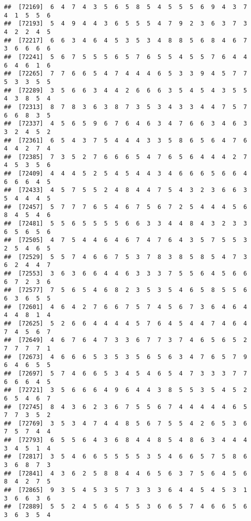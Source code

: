 \documentclass[
]{book}
\begin{document}
\begin{verbatim}
##  [72169]  6  4  7  4  3  5  6  5  8  5  4  5  5  5  6  9  4  3  7  4  1  5  5  6
##  [72193]  5  4  9  4  4  3  6  5  5  5  4  7  9  2  3  6  3  7  3  4  2  2  4  5
##  [72217]  6  6  3  4  6  4  5  3  5  3  4  8  8  5  6  8  4  6  7  3  6  6  6  6
##  [72241]  5  6  7  5  5  5  6  5  7  6  5  5  4  5  5  7  6  4  4  6  4  6  1  6
##  [72265]  7  7  6  6  5  4  7  4  4  4  6  5  3  3  9  4  5  7  7  5  3  3  5  5
##  [72289]  3  5  6  6  3  4  4  2  6  6  6  3  5  4  5  4  3  5  5  4  3  8  5  4
##  [72313]  8  7  8  3  6  3  8  7  3  5  3  4  3  3  4  4  7  5  7  6  6  8  3  5
##  [72337]  4  5  6  5  9  6  7  6  4  6  3  4  7  6  6  3  4  6  3  3  2  4  5  2
##  [72361]  6  5  4  3  7  5  4  4  4  3  3  5  8  6  5  6  4  7  6  4  4  2  7  4
##  [72385]  7  3  5  2  7  6  6  6  5  4  7  6  5  6  4  4  4  2  7  4  5  3  5  6
##  [72409]  4  4  4  5  2  5  4  5  4  4  3  4  6  6  6  5  6  6  4  6  6  6  4  5
##  [72433]  4  5  7  5  5  2  4  8  4  4  7  5  4  3  2  3  6  6  3  5  4  4  4  5
##  [72457]  5  7  7  7  6  5  4  6  7  5  6  7  2  5  4  4  4  5  6  8  4  5  4  6
##  [72481]  5  5  6  5  5  5  5  6  6  3  3  4  4  8  4  3  2  3  3  6  5  6  5  6
##  [72505]  4  7  5  4  4  6  4  6  7  4  7  6  4  3  5  7  5  5  3  2  5  4  6  5
##  [72529]  5  5  7  4  6  6  7  5  3  7  8  3  8  5  8  5  4  7  3  6  2  4  4  7
##  [72553]  3  6  3  6  6  4  4  6  3  3  3  7  5  5  6  4  5  6  6  6  7  2  3  6
##  [72577]  7  5  6  5  4  6  8  2  3  5  3  5  4  6  5  8  5  5  6  6  3  6  5  5
##  [72601]  4  6  4  2  7  6  6  7  5  7  4  5  6  7  3  6  4  6  4  4  4  8  1  4
##  [72625]  5  2  6  6  4  4  4  4  5  7  6  4  5  4  4  7  4  6  4  7  4  5  6  7
##  [72649]  4  6  7  6  4  7  3  3  6  7  7  3  7  4  6  5  6  5  2  7  7  7  7  1
##  [72673]  4  6  6  6  5  3  5  3  5  6  5  6  3  4  7  6  5  7  9  6  4  6  5  5
##  [72697]  5  7  4  6  6  5  3  4  5  4  6  5  4  7  3  3  3  7  7  6  6  6  4  5
##  [72721]  3  5  6  6  6  4  9  6  4  4  3  8  5  5  3  5  4  5  2  6  5  4  6  7
##  [72745]  8  4  3  6  2  3  6  7  5  5  6  7  4  4  4  4  4  6  5  7  7  3  5  2
##  [72769]  3  5  3  4  7  4  4  8  5  6  7  5  5  4  2  6  5  3  6  7  5  7  4  4
##  [72793]  6  5  5  6  4  3  6  8  4  4  8  5  4  8  6  3  4  4  4  3  4  5  1  4
##  [72817]  3  5  4  6  6  5  5  5  5  3  5  4  6  6  5  7  5  8  6  3  6  8  7  3
##  [72841]  4  3  6  2  5  8  8  4  4  6  5  6  3  7  5  6  4  5  6  8  4  2  7  5
##  [72865]  9  3  5  4  5  3  5  7  3  3  3  6  4  4  5  4  5  3  1  3  6  6  3  6
##  [72889]  5  5  2  4  5  6  4  5  5  3  6  6  5  7  4  6  6  5  6  3  6  3  5  4

\end{verbatim}
\end{document}

